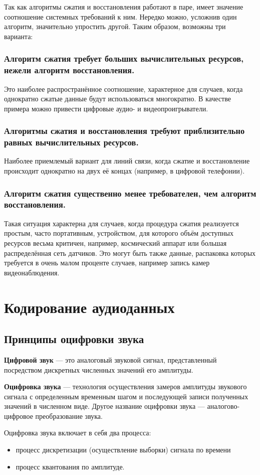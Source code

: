 \documentclass[a4paper]{report}
\begin{document}
Так как алгоритмы сжатия и восстановления работают в паре, имеет значение соотношение системных требований к ним. Нередко можно, усложнив один алгоритм, значительно упростить другой. Таким образом, возможны три варианта:
\subsubsection{Алгоритм сжатия требует больших вычислительных ресурсов, нежели алгоритм восстановления.}
Это наиболее распространённое соотношение, характерное для случаев, когда однократно сжатые данные будут использоваться многократно. В качестве примера можно привести цифровые аудио- и видеопроигрыватели.
\subsubsection{Алгоритмы сжатия и восстановления требуют приблизительно равных вычислительных ресурсов.}
Наиболее приемлемый вариант для линий связи, когда сжатие и восстановление происходит однократно на двух её концах (например, в цифровой телефонии).
\subsubsection{Алгоритм сжатия существенно менее требователен, чем алгоритм восстановления.}
Такая ситуация характерна для случаев, когда процедура сжатия реализуется простым, часто портативным, устройством, для которого объём доступных ресурсов весьма критичен, например, космический аппарат или большая распределённая сеть датчиков. Это могут быть также данные, распаковка которых требуется в очень малом проценте случаев, например запись камер видеонаблюдения.
\section{Кодирование аудиоданных}
\subsection{Принципы оцифровки звука}
\textbf{Цифровой звук} — это аналоговый звуковой сигнал, представленный посредством дискретных численных значений его амплитуды.

\textbf{Оцифровка звука} — технология осуществления замеров амплитуды звукового сигнала с определенным временным шагом и последующей записи полученных значений в численном виде.
Другое название оцифровки звука — аналогово-цифровое преобразование звука.

Оцифровка звука включает в себя два процесса:
\begin{itemize}
\item процесс дискретизации (осуществление выборки) сигнала по времени
\item процесс квантования по амплитуде.
\end{itemize}
\end{document}
